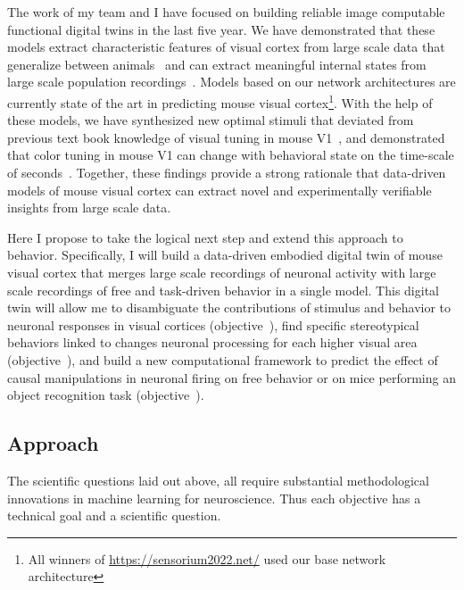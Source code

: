 \documentclass[COG,11pt]{ercgrant}
\begin{document}
The work of my team and I have focused on building reliable image computable functional digital  twins in the last five year. We have demonstrated that these models extract characteristic features of visual cortex from large scale data that generalize between animals~\parencite{Sinz2018-sk,Lurz2020-ua,Cobos2022-rr} and can extract meaningful internal states from large scale population recordings~\parencite{Bashiri2021-or}. 
Models based on our network architectures are currently state of the art in predicting mouse visual cortex\footnote{All winners of  \url{https://sensorium2022.net/} used our base network architecture}. 
With the help of these models, we have synthesized new optimal stimuli that deviated from previous text book knowledge of visual tuning in mouse V1~\parencite{Walker2019-yw}, and demonstrated that color tuning in mouse V1 can change with behavioral state on the time-scale of seconds~\parencite{Franke2022-do}. Together, these findings provide a strong rationale that data-driven models of mouse visual cortex can extract novel and experimentally verifiable insights from large scale data. 

Here I propose to take the logical next step and extend this approach to behavior. 
Specifically, I will build a data-driven embodied digital twin of mouse visual cortex that merges large scale recordings of neuronal activity with large scale recordings of free and task-driven behavior in a single model. 
This digital twin will allow me to  disambiguate the contributions of stimulus and behavior to neuronal responses in visual cortices (objective~\obji),  find specific stereotypical behaviors linked to changes neuronal processing for each higher visual area (objective~\objii), and  build a new computational framework to predict the effect of causal manipulations in neuronal firing on free behavior or on mice performing an object recognition task (objective~\objiii). 

\subsection{Approach}

The scientific questions laid out above, all require substantial methodological innovations in machine learning for neuroscience. Thus each objective has a technical goal and a scientific question. 
\end{document}
